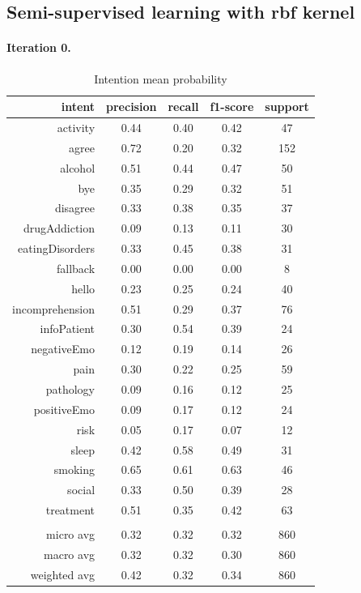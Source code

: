 \documentclass[11pt]{article}
\begin{document}
\subsection{Semi-supervised learning with rbf kernel}
\label{subsec:semisupervised-rbf}

\paragraph{Iteration 0.}
\begin{table}[htb]
\begin{center}
\begin{tabular}{ |r|c|c|c|c| }
\hline
intent &precision & recall & f1-score & support\\ \hline 
activity & 0.44 & 0.40 & 0.42 &  47\\ \hline 
agree & 0.72 & 0.20 & 0.32 & 152\\ \hline 
alcohol & 0.51 & 0.44 & 0.47 &  50\\ \hline 
bye & 0.35 & 0.29 & 0.32 &  51\\ \hline 
disagree & 0.33 & 0.38 & 0.35 &  37\\ \hline 
drugAddiction & 0.09 & 0.13 & 0.11 &  30\\ \hline 
eatingDisorders & 0.33 & 0.45 & 0.38 &  31\\ \hline 
fallback & 0.00 & 0.00 & 0.00 &   8\\ \hline 
hello & 0.23 & 0.25 & 0.24 &  40\\ \hline 
incomprehension & 0.51 & 0.29 & 0.37 &  76\\ \hline 
infoPatient & 0.30 & 0.54 & 0.39 &  24\\ \hline 
negativeEmo & 0.12 & 0.19 & 0.14 &  26\\ \hline 
pain & 0.30 & 0.22 & 0.25 &  59\\ \hline 
pathology & 0.09 & 0.16 & 0.12 &  25\\ \hline 
positiveEmo & 0.09 & 0.17 & 0.12 &  24\\ \hline 
risk & 0.05 & 0.17 & 0.07 &  12\\ \hline 
sleep & 0.42 & 0.58 & 0.49 &  31\\ \hline 
smoking & 0.65 & 0.61 & 0.63 &  46\\ \hline 
social & 0.33 & 0.50 & 0.39 &  28\\ \hline 
treatment & 0.51 & 0.35 & 0.42 &  63\\ \hline 
\\ \hline 
micro avg & 0.32 & 0.32 & 0.32 & 860\\ \hline 
macro avg & 0.32 & 0.32 & 0.30 & 860\\ \hline 
weighted avg & 0.42 & 0.32 & 0.34 & 860\\ \hline 
\end{tabular}
\caption{Intention mean probability}
\end{center}
\end{table}
\FloatBarrier
\end{document}
